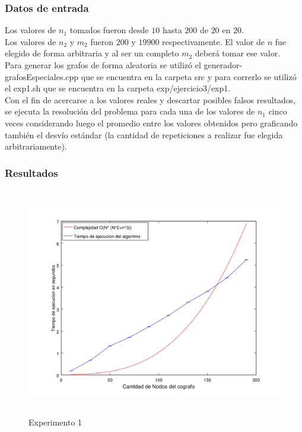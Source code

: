      	\subsubsection*{Datos de entrada}\;
\noindent Los valores de $n_1$ tomados fueron desde $10$ hasta $200$ de $20$ en $20$.\\
       Los valores de $n_2$ y $m_2$ fueron $200$ y $19900$ respectivamente. El valor de $n$ fue elegido de forma arbitraria y al ser un completo $m_2$ deberá tomar ese valor.\\
        Para generar los grafos de forma aleatoria se utilizó el generador-grafosEspeciales.cpp que se encuentra en la carpeta src y para correrlo se utilizó el exp1.sh que se encuentra en la carpeta exp/ejercicio3/exp1. \\
        Con el fin de acercarse a los valores reales y descartar posibles falsos resultados, se ejecuta la resolución del problema para cada una de los valores de $n_1$ cinco veces considerando luego el promedio entre los valores obtenidos pero graficando también el desvío estándar (la cantidad de repeticiones a realizar fue elegida arbitrariamente).\; 

\subsubsection*{Resultados}\;
        
            \begin{figure}[H]
      \includegraphics[height=10cm]{graficos/ejercicio3-exp1.png}
       \caption{Experimento 1}
	\end{figure}
        
